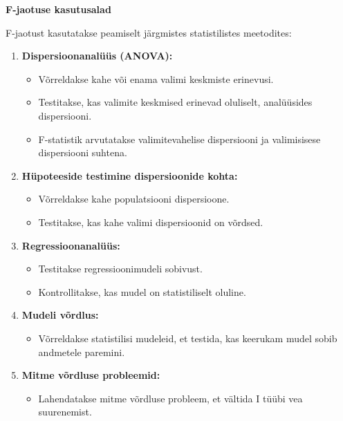 \documentclass[
]{book}
\providecommand{\tightlist}{%
  \setlength{\itemsep}{0pt}\setlength{\parskip}{0pt}}
\begin{document}
\textbf{F-jaotuse kasutusalad}

F-jaotust kasutatakse peamiselt järgmistes statistilistes meetodites:

\begin{enumerate}
\def\labelenumi{\arabic{enumi}.}
\tightlist
\item
  \textbf{Dispersioonanalüüs (ANOVA):}

  \begin{itemize}
  \tightlist
  \item
    Võrreldakse kahe või enama valimi keskmiste erinevusi.
  \item
    Testitakse, kas valimite keskmised erinevad oluliselt, analüüsides dispersiooni.
  \item
    F-statistik arvutatakse valimitevahelise dispersiooni ja valimisisese dispersiooni suhtena.
  \end{itemize}
\item
  \textbf{Hüpoteeside testimine dispersioonide kohta:}

  \begin{itemize}
  \tightlist
  \item
    Võrreldakse kahe populatsiooni dispersioone.
  \item
    Testitakse, kas kahe valimi dispersioonid on võrdsed.
  \end{itemize}
\item
  \textbf{Regressioonanalüüs:}

  \begin{itemize}
  \tightlist
  \item
    Testitakse regressioonimudeli sobivust.
  \item
    Kontrollitakse, kas mudel on statistiliselt oluline.
  \end{itemize}
\item
  \textbf{Mudeli võrdlus:}

  \begin{itemize}
  \tightlist
  \item
    Võrreldakse statistilisi mudeleid, et testida, kas keerukam mudel sobib andmetele paremini.
  \end{itemize}
\item
  \textbf{Mitme võrdluse probleemid:}

  \begin{itemize}
  \tightlist
  \item
    Lahendatakse mitme võrdluse probleem, et vältida I tüübi vea suurenemist.
  \end{itemize}
\end{enumerate}
\end{document}
